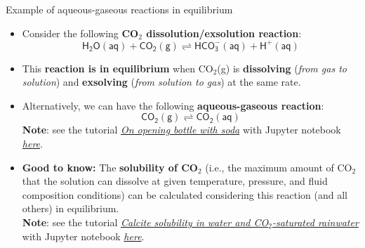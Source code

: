 \begin{frame}{Example of aqueous-gaseous reactions in equilibrium}
	\begin{itemize}
		\item Consider the following \alert{\bf CO$_{2}$ dissolution/exsolution reaction}:
	\[
	\mathsf{H_2O(aq) + CO_{2}(g) \rightleftharpoons HCO^-_3(aq) + H^+(aq)}
	\]
\vskip -10pt
\pause
\item This \alert{\bf reaction is in equilibrium} when CO$_{2}$(g) is \textbf{dissolving
}(\emph{from gas to solution}) and \textbf{exsolving} (\emph{from
solution to gas}) at the same rate. 
	\pause
\item Alternatively, we can have the following \alert{\bf aqueous-gaseous reaction}:
%
\[
\mathsf{CO_{2}(g) \rightleftharpoons CO_2(aq)}
\]
\vskip -10pt
%
\alert{\textbf{Note}}: see the tutorial  \href{https://reaktoro.org/applications/miscellaneous/opening-bottle-with-sparkling-water.html}{\textcolor{indigo(dye)}{\it On opening bottle with soda}} with Jupyter notebook \href{https://github.com/mtsveta/reaktoro-v2-workshop/blob/main/tutorials/applications/opening-bottel-with-soda.ipynb}{\textcolor{indigo(dye)}{\it here}}.
%
\pause
\item \alert{\textbf{Good to know:}} The \textbf{solubility of
CO$_{2}$} (i.e., the maximum amount of CO$_{2}$ that the solution
can dissolve at given temperature, pressure, and fluid composition
conditions) can be calculated considering this reaction (and all others)
in equilibrium. \\[5pt]
%
\alert{\textbf{Note}}: see the tutorial 
\href{https://reaktoro.org/applications/solubility/solubility-calcite-on-acidity-and-temperature.html}{\textcolor{indigo(dye)}{\it Calcite solubility in water and CO$_2$-saturated rainwater}} with Jupyter notebook \href{Calcite solubility in water and CO2-saturated rainwater}{\textcolor{indigo(dye)}{\it here}}.

\end{itemize}
%
%
\end{frame}
%
%
